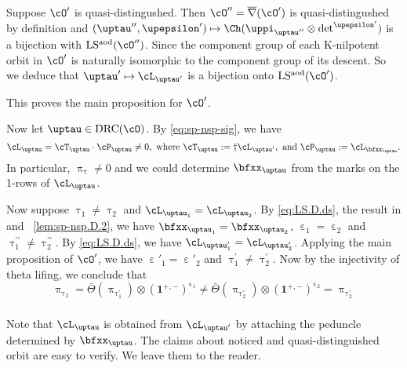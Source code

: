 \documentclass[12pt,a4paper]{amsart}
\newcommand{\bfone}{\mathbf{1}}
\def\eDD{\overline{\nabla}}
\numberwithin{equation}{section}
\theoremstyle{remark}
\def\ssign{\mathrm{Sign}}
\def\Thetab{\bar{\Theta}}
\def\drc{\mathrm{DRC}}
\def\LSaod{\mathrm{LS^{aod}}}
\def\cOp{\cO^{\prime}}
\def\cOpp{\cO^{\prime\prime}}
\def\uptaup{\uptau^{\prime}}
\def\uptaupp{\uptau^{\prime\prime}}
\begin{document}
Suppose $\cOp$ is quasi-distingushed. Then $\cOpp = \eDD(\cOp)$ is
quasi-distingushed by definition
and
$(\uptaupp,\upepsilon')\mapsto \Ch(\uppi_{\uptaupp}\otimes{\det}^{\upepsilon'})$
is  a bijection with $\LSaod(\cOpp)$.
Since the component group of each K-nilpotent orbit in $\cOp$ is naturally
isomorphic to the component group of its descent. So we deduce that $\uptaup \mapsto \cL_{\uptaup}$
is a bijection onto $\LSaod(\cOp)$.

This proves the main proposition for $\cOp$.


Now let $\uptau\in \drc(\cO)$. %
By \eqref{eq:sp-nsp-sig}, we have
\begin{equation}\label{eq:LS.D.ds}
  \cL_{\uptau} =  \cT_{\uptau}\cdot \cP_{\uptau}\neq 0, \text{ where
  }\cT_{\uptau} := \dagger\cL_{\uptaup}, \text{ and } \cP_{\uptau}:=\cL_{\bfxx_{\uptau}}.
\end{equation}
In particular, $\uppi_{\uptau}\neq 0$ and we could determine $\bfxx_{\uptau}$ from
the marks on the 1-rows of $\cL_{\uptau}$.


Now suppose $\uptau_{1} \neq \uptau_{2}$ and
$\cL_{\uptau_{1}}=\cL_{\uptau_{2}}$. By \eqref{eq:LS.D.ds}, the result in
 and
~\eqref{lem:sp-nsp.D.2},
we have
$\bfxx_{\uptau_{1}}=\bfxx_{\uptau_{2}}$,  $\upepsilon_1=\upepsilon_{2}$ and
$\uptaupp_{1}\neq \uptaupp_{2}$.
By \eqref{eq:LS.D.ds}, we have
$\cL_{\uptaup_{1}}=\cL_{\uptaup_{2}}$.
Applying the main proposition of $\cOp$, we have
$\upepsilon'_{1}=\upepsilon'_{2}$ and $\uptaup_{1}\neq \uptaup_{2}$.
Now by the injectivity of theta lifing, we conclude that
\[
  \uppi_{\uptau_{2}} = \Thetab(\uppi_{\uptaup_{1}})\otimes (\bfone^{+,-})^{\upepsilon_{1}}
  \neq \Thetab(\uppi_{\uptaup_{2}})\otimes (\bfone^{+,-})^{\upepsilon_{2}} = \uppi_{\uptaup_{2}}
\]

\subsubsection{}

Note that $\cL_{\uptau}$ is obtained from $\cL_{\uptaup}$ by attaching the peduncle
determined by $\bfxx_{\uptau}$. The claims about noticed and
quasi-distinguished orbit are easy to verify. We leave them to the reader.
\end{document}
